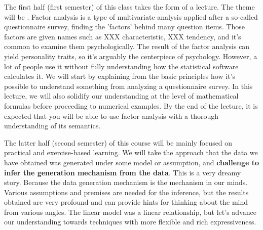 \documentclass{ltjsbook}
\begin{document}
The first half (first semester) of this class takes the form of a lecture. The theme will be . Factor analysis is a type of multivariate analysis applied after a so-called questionnaire survey, finding the 'factors' behind many question items. Those factors are given names such as XXX characteristic, XXX tendency, and it's common to examine them psychologically. The result of the factor analysis can yield personality traits, so it's arguably the centerpiece of psychology. However, a lot of people use it without fully understanding how the statistical software calculates it. We will start by explaining from the basic principles how it's possible to understand something from analyzing a questionnaire survey. In this lecture, we will also solidify our understanding at the level of mathematical formulas before proceeding to numerical examples. By the end of the lecture, it is expected that you will be able to use factor analysis with a thorough understanding of its semantics.

The latter half (second semester) of this course will be mainly focused on practical and exercise-based learning. We will take the approach that the data we have obtained was generated under some model or assumption, and \textbf{challenge to infer the generation mechanism from the data}. This is a very dreamy story. Because the data generation mechanism is the mechanism in our minds. Various assumptions and premises are needed for the inference, but the results obtained are very profound and can provide hints for thinking about the mind from various angles. The linear model was a linear relationship, but let's advance our understanding towards techniques with more flexible and rich expressiveness.
\end{document}
